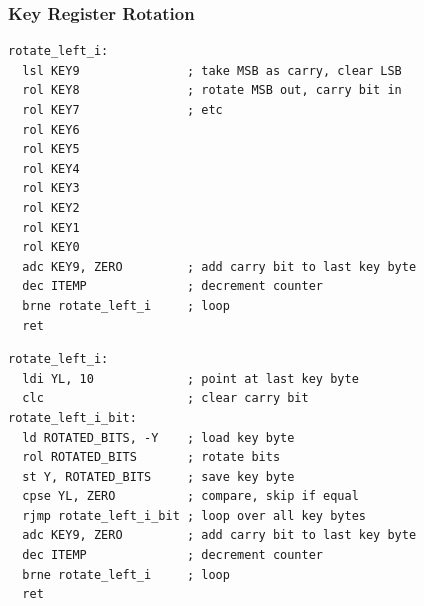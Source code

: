 \documentclass{beamer}
\begin{document}
\begin{frame}[fragile]
\frametitle{Key Register Rotation}
\begin{overprint}
\begin{lstlisting}
rotate_left_i:
  lsl KEY9               ; take MSB as carry, clear LSB
  rol KEY8               ; rotate MSB out, carry bit in
  rol KEY7               ; etc
  rol KEY6
  rol KEY5
  rol KEY4
  rol KEY3
  rol KEY2
  rol KEY1
  rol KEY0
  adc KEY9, ZERO         ; add carry bit to last key byte
  dec ITEMP              ; decrement counter
  brne rotate_left_i     ; loop
  ret
\end{lstlisting}
\begin{lstlisting}
rotate_left_i:
  ldi YL, 10             ; point at last key byte
  clc                    ; clear carry bit
rotate_left_i_bit:
  ld ROTATED_BITS, -Y    ; load key byte
  rol ROTATED_BITS       ; rotate bits
  st Y, ROTATED_BITS     ; save key byte
  cpse YL, ZERO          ; compare, skip if equal
  rjmp rotate_left_i_bit ; loop over all key bytes
  adc KEY9, ZERO         ; add carry bit to last key byte
  dec ITEMP              ; decrement counter
  brne rotate_left_i     ; loop
  ret
\end{lstlisting}
\end{overprint}
\end{frame}


%

%
\end{document}
